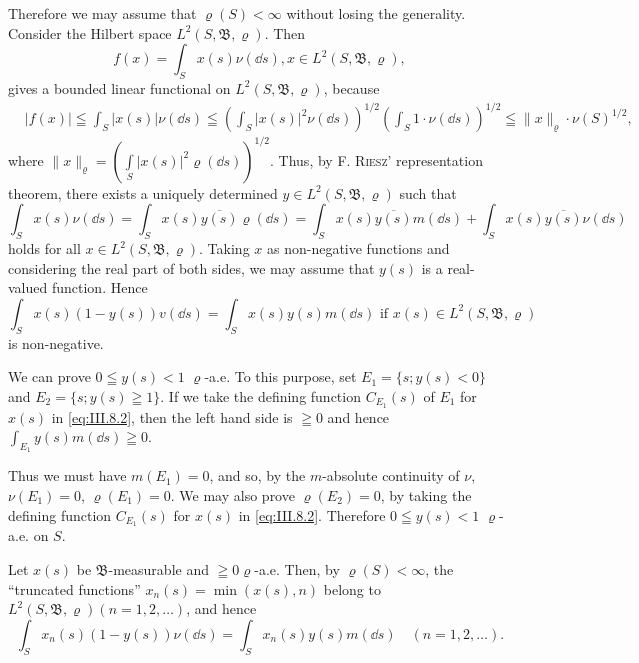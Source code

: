 Therefore we may assume that $\varrho(S) < \infty$ without losing the generality. Consider the Hilbert space $L^2(S, \mathfrak{B}, \varrho)$. Then 
\[
f (x) = \int_{S} x (s) \nu (\dd s), x \in L ^{2} (S, \mathfrak {B}, \varrho),
\]
gives a bounded linear functional on $L^{2}(S, \mathfrak{B}, \varrho)$, because 
\[
\begin{aligned}
&| f (x) |  \leqq \int_{S} | x (s) | \nu (\dd s) \leqq \left(\int_{S} | x (s) | ^{2} \nu (\dd s)\right) ^{1/2} \left(\int_{S} 1 \cdot \nu (\dd s)\right) ^{1/2} \leqq \| x \| _{\varrho} \cdot \nu (S) ^{1/2},
\end{aligned}
\]
where $\| x\| _{\varrho} = \left(\int \limits_{S}|x(s)|^2\varrho (\dd s)\right)^{1/2}$. Thus, by F. \textsc{Riesz}' representation theorem, there exists a uniquely determined $y\in L^{2}(S,\mathfrak{B},\varrho)$ such that 
\[
\int_{S} x (s) \nu (\dd s) = \int_{S} x (s) \overline {{y (s)}} \varrho (\dd s) = \int_{S} x (s) \overline {{y (s)}} m (\dd s) + \int_{S} x (s) \overline {{y (s)}} \nu (\dd s)
\]
holds for all $x \in L^{2}(S, \mathfrak{B}, \varrho)$. Taking $x$ as non-negative functions and considering the real part of both sides, we may assume that $y(s)$ is a real-valued function. Hence 
\begin{equation}\label{eq:III.8.2}
\int_{S} x (s) (1 - y (s)) v (\dd s) = \int_{S} x (s) y (s) m (\dd s) \text{ if } x (s) \in L ^{2} (S, \mathfrak {B}, \varrho)
\end{equation}
is non-negative. 

We can prove $0 \leqq y(s) < 1$ $\varrho$-a.e. To this purpose, set $E_{1} = \{s; y(s) < 0\}$ and $E_{2} = \{s; y(s) \geqq 1\}$. If we take the defining function $C_{E_1}(s)$ of $E_{1}$ for $x(s)$ in \eqref{eq:III.8.2}, then the left hand side is $\geqq 0$ and hence $\int_{E_1} y(s) m(\dd s) \geqq 0$. 

Thus we must have $m(E_1) = 0$, and so, by the $m$-absolute continuity of $\nu$, $\nu(E_1) = 0$, $\varrho(E_1) = 0$. We may also prove $\varrho(E_2) = 0$, by taking the defining function $C_{E_1}(s)$ for $x(s)$ in \eqref{eq:III.8.2}. Therefore $0 \leqq y(s) < 1$ $\varrho$-a.e. on $S$. 

Let $x(s)$ be $\mathfrak{B}$-measurable and $\geqq 0 \varrho$-a.e. Then, by $\varrho(S) < \infty$, the ``truncated functions'' $x_{n}(s) = \min(x(s), n)$ belong to $L^{2}(S, \mathfrak{B}, \varrho) (n = 1, 2, \ldots)$, and hence 
\begin{equation}\label{eq:III.8.3}
\int_{S} x _{n} (s) (1 - y (s)) \nu (\dd s) = \int_{S} x _{n} (s) y (s) m (\dd s) \quad (n = 1, 2, \dots).
\end{equation}

